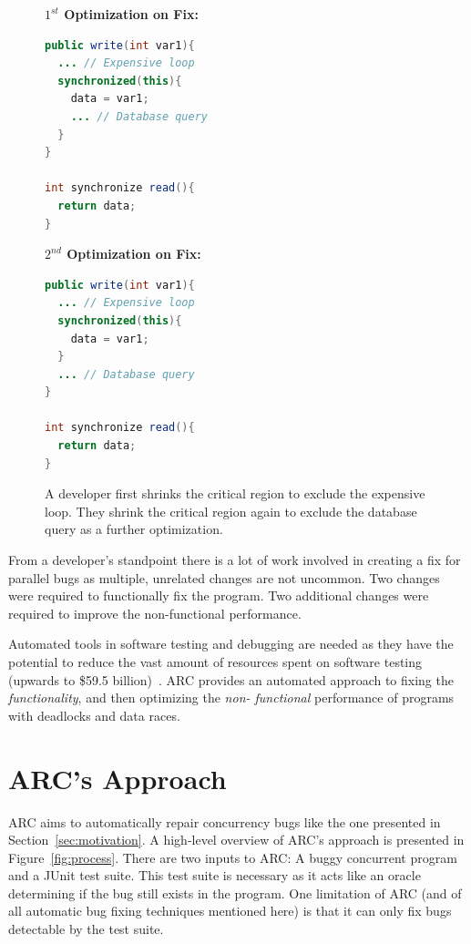 \documentclass[10pt, conference, compsocconf]{IEEEtran}
\begin{document}
\begin{figure}[!h]
\vspace{2mm}
\begin{minipage}{3.70cm}
\footnotesize{\textbf{$1^{st}$ Optimization on Fix:}}
\begin{lstlisting}[language=Java]
public write(int var1){
  ... // Expensive loop
  synchronized(this){
    data = var1;
    ... // Database query
  }
}

int synchronize read(){
  return data;
}
\end{lstlisting}
\end{minipage}\hfill
\begin{minipage}{3.70cm}
\footnotesize{\textbf{$2^{nd}$ Optimization on Fix:}}
\begin{lstlisting}[language=Java]
public write(int var1){
  ... // Expensive loop
  synchronized(this){
    data = var1;
  }
  ... // Database query
}

int synchronize read(){
  return data;
}
\end{lstlisting}
\end{minipage}
\caption{A developer first shrinks the critical region to exclude the expensive
loop. They shrink the critical region again to exclude the database query as a
further optimization.}
\label{fig:optimized_sample_datarace}
\end{figure}

From a developer's standpoint there is a lot of work involved in creating a fix
for parallel bugs as multiple, unrelated changes are not uncommon. Two changes 
were required to functionally fix the program. Two additional changes were 
required to improve the non-functional performance.

Automated tools in software testing and debugging are needed as they have the
potential to reduce the vast amount of resources spent on software testing
(upwards to \$59.5 billion)~\cite{RTI02}. ARC provides an automated approach to
fixing the \textit{functionality}, and then optimizing the \textit{non-
functional} performance of programs with deadlocks and data races.

\section{ARC's Approach}
\label{sec:approach}

ARC aims to automatically repair concurrency bugs like the one
presented in Section~\ref{sec:motivation}. A high-level overview of ARC's
approach is presented in Figure~\ref{fig:process}. There are two inputs to ARC:
A buggy concurrent program and a JUnit test suite. This
test suite is necessary as it acts like an oracle determining if the bug
still exists in the program. One limitation of ARC (and of all automatic bug
fixing techniques mentioned here) is that it can only fix bugs detectable by 
the test suite.
\end{document}
